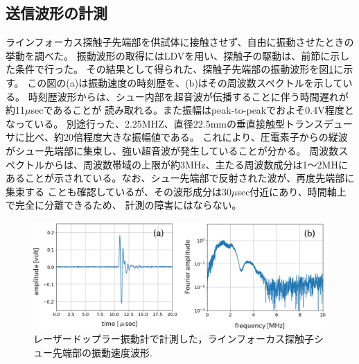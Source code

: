 \subsection{送信波形の計測}
ラインフォーカス探触子先端部を供試体に接触させず、自由に振動させたときの挙動を調べた。
振動波形の取得にはLDVを用い、探触子の駆動は、前節に示した条件で行った。
その結果として得られた、探触子先端部の振動波形を図\ref{fig:fig5}に示す。
この図の(a)は振動速度の時刻歴を、(b)はその周波数スペクトルを示している。
時刻歴波形からは、シュー内部を超音波が伝播することに伴う時間遅れが約11$\mu$secであることが
読み取れる。また振幅はpeak-to-peakでおよそ0.4V程度となっている。
別途行った、2.25MHZ、直径22.5mmの垂直接触型トランスデューサに比べ、約20倍程度大きな振幅値である。
これにより、圧電素子からの縦波がシュー先端部に集束し、強い超音波が発生していることが分かる。
周波数スペクトルからは、周波数帯域の上限が約3MHz、主たる周波数成分は1〜2MHに
あることが示されている。なお、シュー先端部で反射された波が、再度先端部に集束する
ことも確認しているが、その波形成分は30$\mu$sec付近にあり、時間軸上で完全に分離できるため、
計測の障害にはならない。
\begin{figure}[h]
	\begin{center}
	\includegraphics[width=0.9\linewidth]{Figs/fig5.eps} 
	\end{center}
	\caption{
		レーザードップラー振動計で計測した，ラインフォーカス探触子シュー先端部の振動速度波形.
	} 
	\label{fig:fig5}
\end{figure}
